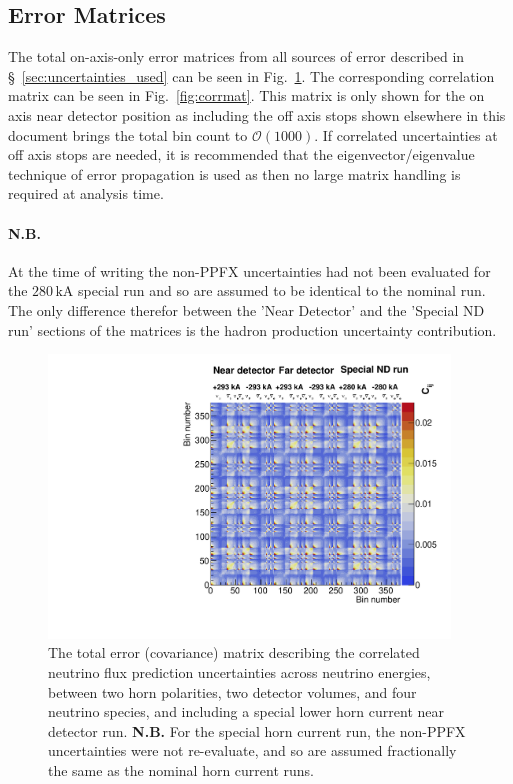 \documentclass{article}
\begin{document}
\subsection{Error Matrices}

The total on-axis-only error matrices from all sources of error described in \S~\ref{sec:uncertainties_used} can be seen in Fig.~\ref{fig:covmat}. The corresponding correlation matrix can be seen in Fig.~\ref{fig:corrmat}. This matrix is only shown for the on axis near detector position as including the off axis stops shown elsewhere in this document brings the total bin count to $\mathcal{O}\left(1000\right)$. If correlated uncertainties at off axis stops are needed, it is recommended that the eigenvector/eigenvalue technique of error propagation is used as then no large matrix handling is required at analysis time.

\paragraph{N.B.} At the time of writing the non-PPFX uncertainties had not been evaluated for the $280\,\textrm{kA}$ special run and so are assumed to be identical to the nominal run. The only difference therefor between the 'Near Detector' and the 'Special ND run' sections of the matrices is the hadron production uncertainty contribution.

\begin{figure}
  \centering
  \includegraphics[width=0.95\textwidth]{plots/mats/ErrorMatrices_covmat}
  \caption{The total error (covariance) matrix describing the correlated neutrino flux prediction uncertainties across neutrino energies, between two horn polarities, two detector volumes, and four neutrino species, and including a special lower horn current near detector run. \textbf{N.B.} For the special horn current run, the non-PPFX uncertainties were not re-evaluate, and so are assumed fractionally the same as the nominal horn current runs.}
  \label{fig:covmat}
\end{figure}
\end{document}
